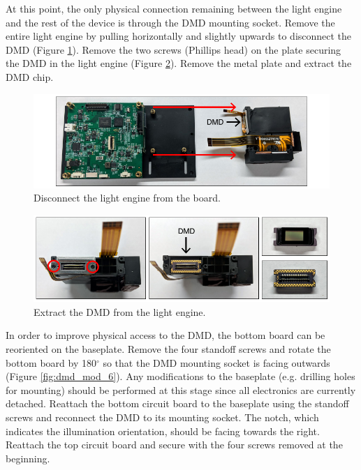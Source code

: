 At this point, the only physical connection remaining between the light engine and the rest of the device is through the DMD mounting socket. Remove the entire light engine by pulling horizontally and slightly upwards to disconnect the DMD (Figure \ref{fig:dmd_mod_4}). Remove the two screws (Phillips head) on the plate securing the DMD in the light engine (Figure \ref{fig:dmd_mod_5}). Remove the metal plate and extract the DMD chip.

\begin{figure}
    \includegraphics{figures/appendix_b/dmd_mod_4.pdf}
    \caption {
        \label{fig:dmd_mod_4}
        Disconnect the light engine from the board.
    }
\end{figure}

\begin{figure}
    \includegraphics{figures/appendix_b/dmd_mod_5.pdf}
    \caption {
        \label{fig:dmd_mod_5}
        Extract the DMD from the light engine.
    }
\end{figure}

In order to improve physical access to the DMD, the bottom board can be reoriented on the baseplate. Remove the four standoff screws and rotate the bottom board by 180$^\circ$ so that the DMD mounting socket is facing outwards (Figure \ref{fig:dmd_mod_6}). Any modifications to the baseplate (e.g. drilling holes for mounting) should be performed at this stage since all electronics are currently detached. Reattach the bottom circuit board to the baseplate using the standoff screws and reconnect the DMD to its mounting socket. The notch, which indicates the illumination orientation, should be facing towards the right. Reattach the top circuit board and secure with the four screws removed at the beginning.

